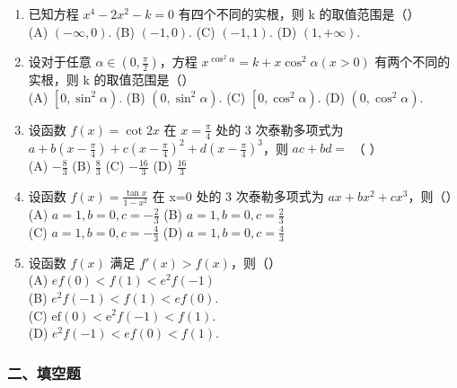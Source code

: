 \documentclass[12pt, a4paper]{ctexart}
\begin{document}
\begin{enumerate}
    \item 已知方程 $ x^{4}-2x^{2}-k=0 $ 有四个不同的实根，则 k 的取值范围是（）\\
    (A) $ \left(-\infty,0\right) $. \quad (B) $ \left(-1,0\right) $. \quad (C) $ \left(-1,1\right) $. \quad (D) $ \left(1,+\infty\right) $.

    \item 设对于任意 $ \alpha \in \left(0, \frac{\pi}{2}\right) $，方程 $ x^{\cos^2 \alpha} = k + x \cos^2 \alpha (x > 0) $ 有两个不同的实根，则 k 的取值范围是（）\\
    (A) $ \left[0,\sin^{2}\alpha\right) $. \quad (B) $ \left(0,\sin^{2}\alpha\right) $. \quad (C) $ \left[0,\cos^{2}\alpha\right) $. \quad (D) $ \left(0,\cos^{2}\alpha\right) $.

    \item 设函数 $ f(x)=\cot 2x $ 在 $ x=\frac{\pi}{4} $ 处的 3 次泰勒多项式为 $ a+b\left(x-\frac{\pi}{4}\right)+c\left(x-\frac{\pi}{4}\right)^2+ d\left(x-\frac{\pi}{4}\right)^3 $，则 $ ac+bd= $ （ ）\\
    (A) $ -\frac{8}{3} $ \quad (B) $ \frac{8}{3} $ \quad (C) $ -\frac{16}{3} $ \quad (D) $ \frac{16}{3} $

    \item 设函数 $ f(x)=\frac{\tan x}{1-x^{2}} $ 在 x=0 处的 3 次泰勒多项式为 $ ax+bx^{2}+cx^{3} $，则（）\\
    (A) $ a=1, b=0, c=-\frac{2}{3} $ \quad (B) $ a=1, b=0, c=\frac{2}{3} $\\
    (C) $ a=1, b=0, c=-\frac{4}{3} $ \quad (D) $ a=1, b=0, c=\frac{4}{3} $

    \item 设函数 $ f(x) $ 满足 $ f'(x) > f(x) $，则（）\\
    (A) $ ef(0) < f(1) < e^{2} f(-1) $\\
    (B) $ e^{2}f(-1) < f(1) < ef(0) $.\\
    (C) $ \mathrm{ef}(0) < \mathrm{e}^{2} f(-1) < f(1) $.\\
    (D) $ e^{2}f(-1) < ef(0) < f(1) $.
\end{enumerate}

\subsubsection*{二、填空题}
\end{document}
